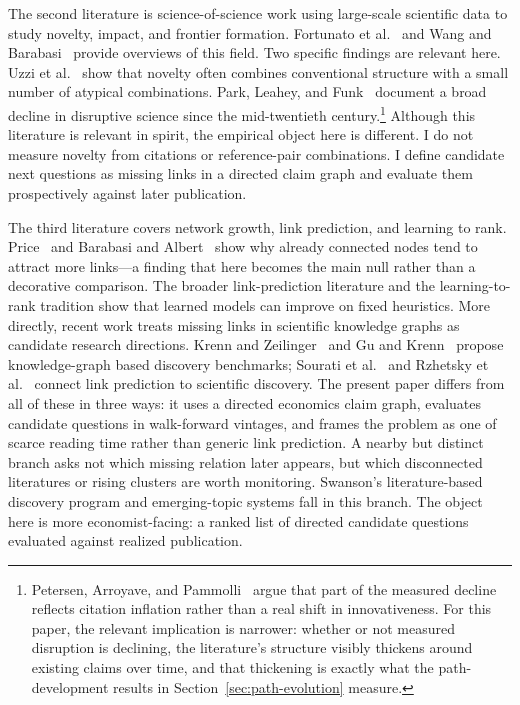 \documentclass[11pt]{article}
\begin{document}
The second literature is science-of-science work using large-scale scientific data to study novelty, impact, and frontier formation. Fortunato et al.~\citeyearpar{fortunato2018science} and Wang and Barabasi~\citeyearpar{wang2021science} provide overviews of this field. Two specific findings are relevant here. Uzzi et al.~\citeyearpar{uzzi2013atypical} show that novelty often combines conventional structure with a small number of atypical combinations. Park, Leahey, and Funk~\citeyearpar{park2023disruptive} document a broad decline in disruptive science since the mid-twentieth century.\footnote{Petersen, Arroyave, and Pammolli~\citeyearpar{petersen2024disruption} argue that part of the measured decline reflects citation inflation rather than a real shift in innovativeness. For this paper, the relevant implication is narrower: whether or not measured disruption is declining, the literature's structure visibly thickens around existing claims over time, and that thickening is exactly what the path-development results in Section~\ref{sec:path-evolution} measure.} Although this literature is relevant in spirit, the empirical object here is different. I do not measure novelty from citations or reference-pair combinations. I define candidate next questions as missing links in a directed claim graph and evaluate them prospectively against later publication.

The third literature covers network growth, link prediction, and learning to rank. Price~\citeyearpar{price1976general} and Barabasi and Albert~\citeyearpar{barabasi1999emergence} show why already connected nodes tend to attract more links---a finding that here becomes the main null rather than a decorative comparison. The broader link-prediction literature \citep{liben2007link,martinez2016survey} and the learning-to-rank tradition \citep{liu2009learning} show that learned models can improve on fixed heuristics. More directly, recent work treats missing links in scientific knowledge graphs as candidate research directions. Krenn and Zeilinger~\citeyearpar{krenn2020predicting} and Gu and Krenn~\citeyearpar{gu2025impact4cast} propose knowledge-graph based discovery benchmarks; Sourati et al.~\citeyearpar{sourati2023accelerating} and Rzhetsky et al.~\citeyearpar{rzhetsky2015choosing} connect link prediction to scientific discovery. The present paper differs from all of these in three ways: it uses a directed economics claim graph, evaluates candidate questions in walk-forward vintages, and frames the problem as one of scarce reading time rather than generic link prediction. A nearby but distinct branch asks not which missing relation later appears, but which disconnected literatures or rising clusters are worth monitoring. Swanson's literature-based discovery program \citep{swanson1986upk} and emerging-topic systems \citep{blei2006dynamictopics,chen2006citespace,small2014emergingtopics} fall in this branch. The object here is more economist-facing: a ranked list of directed candidate questions evaluated against realized publication.
\end{document}
